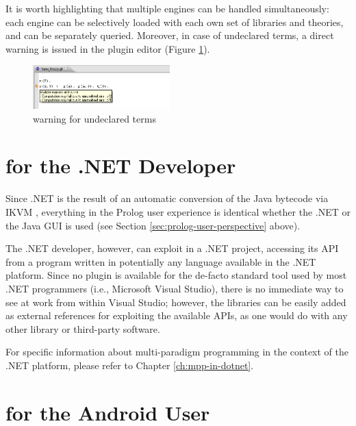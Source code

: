 It is worth highlighting that multiple \tuprolog{}  engines can be handled simultaneously: each engine can be selectively loaded with each own set of libraries and theories, and can be separately queried.
%
Moreover, in case of undeclared terms, a direct warning is issued in the plugin editor  (Figure \ref{fig:plugin11}).

\begin{figure}
\centering
  \includegraphics[width=200px]{images/plugin11.png}
  \caption{warning for undeclared terms}\label{fig:plugin11}
\end{figure}

\section{\tuprolog{} for the .NET Developer}
\label{sec:dotnet-user-perspective}

Since \tuprolog{}.NET is the result of an automatic conversion of the Java bytecode via IKVM \cite{ikvm}, everything in the Prolog user experience is identical whether the .NET or the Java GUI is used (see Section \ref{sec:prolog-user-perspective} above).

The .NET developer, however, can exploit \tuprolog{} in a .NET project, accessing its API from a program written in potentially any language available in the .NET platform.
%
Since no plugin is available for the de-facto standard tool used by most .NET programmers (i.e., Microsoft Visual Studio), there is no immediate way to see \tuprolog{} at work from within Visual Studio; however, the \tuprolog{} libraries can be easily added as external references for exploiting the available APIs, as one would do with any other library or third-party software.

For specific information about multi-paradigm programming in the context of the .NET platform, please refer to Chapter \ref{ch:mpp-in-dotnet}.


\section{\tuprolog{} for the Android User}
\label{sec:android-user-perspective}

